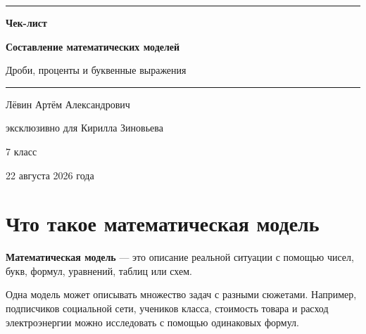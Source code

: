 \documentclass[a4paper,12pt]{article}
\newcommand{\important}[1]{\par\medskip{\color{darkaccent}\bfseries #1}\par\smallskip}
\begin{document}
\begin{titlepage}
\thispagestyle{empty}
\centering
\vspace*{2.8cm}
{\color{accent}\rule{0.72\linewidth}{1.1pt}\par}
\vspace{1.3cm}
{\fontsize{23}{28}\selectfont\bfseries Чек-лист\par}
\vspace{0.7cm}
{\fontsize{28}{34}\selectfont\bfseries\color{darkaccent}Составление математических моделей\par}
\vspace{0.45cm}
{\Large Дроби, проценты и буквенные выражения\par}
\vspace{1.5cm}
{\color{accent}\rule{0.42\linewidth}{0.8pt}\par}
\vfill
{\large Лёвин Артём Александрович\par}
\vspace{0.35cm}
{\large эксклюзивно для Кирилла Зиновьева\par}
\vspace{0.9cm}
{\large 7 класс\par}
\vspace{0.5cm}
{\large 22 августа 2026 года\par}
\vspace{2.1cm}
\end{titlepage}

\section{Что такое математическая модель}

\textbf{Математическая модель} --- это описание реальной ситуации с помощью чисел, букв, формул, уравнений, таблиц или схем.

Одна модель может описывать множество задач с разными сюжетами. Например, подписчиков социальной сети, учеников класса, стоимость товара и расход электроэнергии можно исследовать с помощью одинаковых формул.

\important{Главный принцип}
\end{document}
